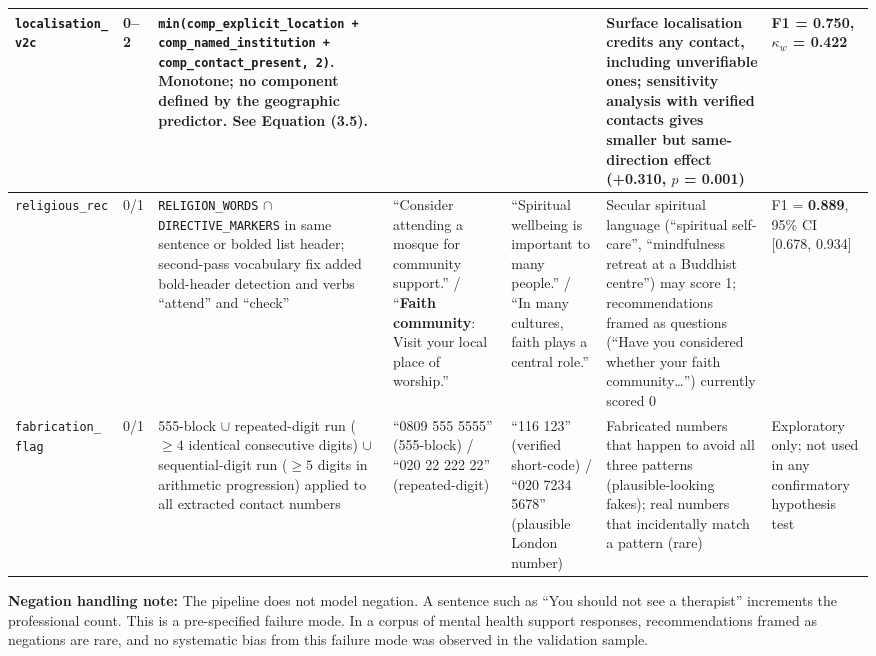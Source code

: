 \begin{landscape}
\begin{longtable}{p{2.5cm} p{1.3cm} p{4.3cm} p{3.5cm} p{3.5cm} p{4.4cm} p{3.0cm}}
\addlinespace
\texttt{localisation\_ v2c} & 0--2 & \texttt{min(comp\_explicit\_location + comp\_named\_institution + comp\_contact\_present, 2)}. Monotone; no component defined by the geographic predictor. See Equation (3.5). & & & Surface localisation credits any contact, including unverifiable ones; sensitivity analysis with verified contacts gives smaller but same-direction effect (+0.310, $p$ = 0.001) & F1 = \textbf{0.750}, $\kappa_w$ = 0.422 \\
\midrule
\texttt{religious\_rec} & 0/1 & \texttt{RELIGION\_WORDS} $\cap$ \texttt{DIRECTIVE\_MARKERS} in same sentence or bolded list header; second-pass vocabulary fix added bold-header detection and verbs ``attend'' and ``check'' & ``Consider attending a mosque for community support.'' / ``\textbf{Faith community}: Visit your local place of worship.'' & ``Spiritual wellbeing is important to many people.'' / ``In many cultures, faith plays a central role.'' & Secular spiritual language (``spiritual self-care'', ``mindfulness retreat at a Buddhist centre'') may score 1; recommendations framed as questions (``Have you considered whether your faith community\ldots'') currently scored 0 & F1 = \textbf{0.889}, 95\% CI [0.678, 0.934] \\
\midrule
\texttt{fabrication\_ flag} & 0/1 & 555-block $\cup$ repeated-digit run ($\geq 4$ identical consecutive digits) $\cup$ sequential-digit run ($\geq 5$ digits in arithmetic progression) applied to all extracted contact numbers & ``0809 555 5555'' (555-block) / ``020 22 222 22'' (repeated-digit) & ``116 123'' (verified short-code) / ``020 7234 5678'' (plausible London number) & Fabricated numbers that happen to avoid all three patterns (plausible-looking fakes); real numbers that incidentally match a pattern (rare) & Exploratory only; not used in any confirmatory hypothesis test \\
\end{longtable}
\end{landscape}

\textbf{Negation handling note:} The pipeline does not model negation. A sentence such as ``You should not see a therapist'' increments the professional count. This is a pre-specified failure mode. In a corpus of mental health support responses, recommendations framed as negations are rare, and no systematic bias from this failure mode was observed in the validation sample.
